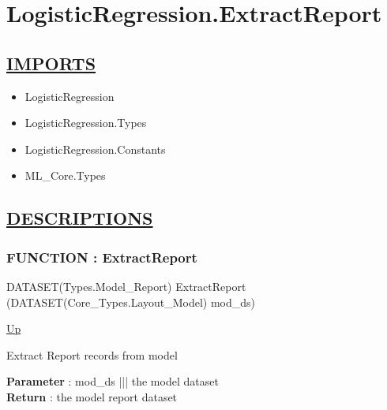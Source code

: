 \chapter*{LogisticRegression.ExtractReport}
\hypertarget{ecldoc:toc:LogisticRegression.ExtractReport}{}

\section*{\underline{IMPORTS}}
\begin{itemize}
\item LogisticRegression
\item LogisticRegression.Types
\item LogisticRegression.Constants
\item ML\_Core.Types
\end{itemize}

\section*{\underline{DESCRIPTIONS}}
\subsection*{FUNCTION : ExtractReport}
\hypertarget{ecldoc:logisticregression.extractreport}{}
\begin{minipage}[t]{\textwidth}
\begin{flushleft}
DATASET(Types.Model\_Report) ExtractReport (DATASET(Core\_Types.Layout\_Model) mod\_ds)
\end{flushleft}
\end{minipage}
\hyperlink{ecldoc:toc:LogisticRegression}{Up}

\par
Extract Report records from model
\par
\textbf{Parameter} : mod\_ds ||| the model dataset \\
\textbf{Return} : the model report dataset \\
